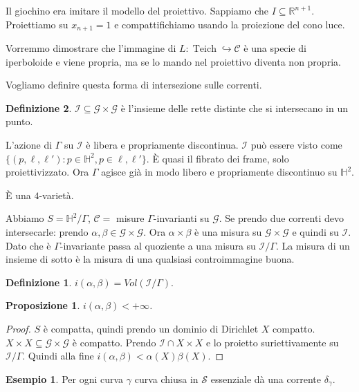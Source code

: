 \documentclass[a4paper]{article}
\newtheorem{proposition}{Proposizione}
\theoremstyle{definition}
\newtheorem{definition}{Definizione}
\newtheorem{example}{Esempio}
\DeclareMathOperator{\Teich}{Teich}
\begin{document}
Il giochino era imitare il modello del proiettivo. Sappiamo che $I \subseteq \mathbb R^{n + 1}$. Proiettiamo su $x_{n + 1} = 1$ e compattifichiamo usando la proiezione del cono luce.

Vorremmo dimostrare che l'immagine di $L: \Teich \hookrightarrow \mathcal C$ è una specie di iperboloide e viene propria, ma se lo mando nel proiettivo diventa non propria.

Vogliamo definire questa forma di intersezione sulle correnti.

\begin{definition}
    $\mathcal I \subseteq \mathcal G \times \mathcal G$ è l'insieme delle rette distinte che si intersecano in un punto.

    L'azione di $\Gamma$ su $\mathcal I$ è libera e propriamente discontinua. $\mathcal I$ può essere visto come $\{(p,\ell,\ell'): p \in \mathbb H^2, p \in \ell,\ell'\}$. È quasi il fibrato dei frame, solo proiettivizzato. Ora $\Gamma$ agisce già in modo libero e propriamente discontinuo su $\mathbb H^2$.

    È una $4$-varietà.

    Abbiamo $S = \mathbb H^2 / \Gamma$, $\mathcal C =$ misure $\Gamma$-invarianti su $\mathcal G$. Se prendo due correnti devo intersecarle: prendo $\alpha, \beta \in \mathcal G \times \mathcal G$. Ora $\alpha \times \beta$ è una misura su $\mathcal G \times \mathcal G$ e quindi su $\mathcal I$. Dato che è $\Gamma$-invariante passa al quoziente a una misura su $\mathcal I / \Gamma$. La misura di un insieme di sotto è la misura di una qualsiasi controimmagine buona.
    \begin{definition}
        $i(\alpha,\beta) = Vol(\mathcal I / \Gamma)$.
    \end{definition}

    \begin{proposition}
        $i(\alpha,\beta) < + \infty$.
    \end{proposition}
    \begin{proof}
        $S$ è compatta, quindi prendo un dominio di Dirichlet $X$ compatto. $X \times X \subseteq \mathcal G \times \mathcal G$ è compatto. Prendo $\mathcal I \cap X \times X$ e lo proietto suriettivamente su $\mathcal I / \Gamma$. Quindi alla fine $i(\alpha,\beta)<\alpha(X) \beta(X)$.
    \end{proof}

    \begin{example}
        Per ogni curva $\gamma$ curva chiusa in $\mathcal S$ essenziale dà una corrente $\delta_\gamma$.
    \end{example}


\end{definition}
\end{document}
